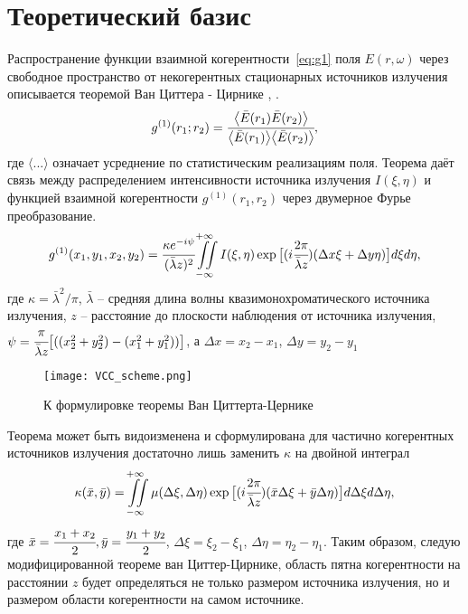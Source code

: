 \chapter{Теоретический базис} \label{chapt1}

Распространение функции взаимной когерентности~\ref{eq:g1} поля $E(r, \omega)$ через свободное пространство от некогерентных стационарных источников излучения описывается теоремой Ван Циттера - Цирнике \cite{van_cittert_wahrscheinliche_1934}, \cite{zernike_concept_1938}. 
\begin{align}
	g^{(1)} (r_1; r_2) = \cfrac{\big \langle \bar{E}(r_1) \bar{E}(r_2) \big \rangle}{\big \langle \bar{E}(r_1)\big \rangle \big \langle\bar{E}(r_2) \big \rangle}, 
	\label{eq:g1} 
\end{align}
где $\big \langle ... \big \rangle$ означает усреднение по статистическим реализациям поля. Теорема даёт связь между распределением интенсивности источника излучения $I(\xi, \eta)$ и функцией взаимной когерентности $g^{(1)} (r_1, r_2)$ через двумерное Фурье преобразование. 
\begin{align}
	g^{(1)} (x_1, y_1, x_2, y_2) = \cfrac{\kappa e^{-i\psi}}{(\bar{\lambda}z)^2} \iint \limits_{-\infty}^{+\infty} I(\xi, \eta) \exp{\big [(i \cfrac{2 \pi}{\bar{\lambda}z}) (\Delta x \xi + \Delta y \eta)\big]}d\xi d\eta, 
	\label{eq:van_cittert_zernike_theorem} 
\end{align}
где $\kappa = \bar{\lambda}^2 / \pi$, $\bar{\lambda}$ -- средняя длина волны квазимонохроматического источника излучения, $z$ -- расстояние до плоскости наблюдения от источника излучения, $\psi = \cfrac{\pi}{\bar{\lambda} z}\big[((x^2_2 + y^2_2) - (x^2_1 + y^2_1)) \big]$, а $\Delta x = x_2 - x_1$, $\Delta y = y_2 - y_1$

\begin{figure}[H] 
	\centering 	\texttt{[image: VCC\_scheme.png]}
	\caption{К формулировке теоремы Ван Циттерта-Цернике}
	\label{fig:VCC_scheme}
\end{figure}

Теорема может быть видоизменена и сформулирована для частично когерентных источников излучения достаточно лишь заменить $\kappa$ на двойной интеграл \cite{goodman_statistical_2015}
\begin{align}
	\kappa(\bar{x}, \bar{y}) = \iint \limits_{-\infty}^{+\infty} \mu(\Delta \xi, \Delta \eta) \exp{\big [(i \cfrac{2 \pi}{\bar{\lambda}z}) ( \bar{x} \Delta \xi + \bar{y} \Delta \eta)\big]}d\Delta \xi d\Delta \eta, 
\end{align}
где $\bar{x} = \cfrac{x_1 + x_2}{2}, \bar{y} = \cfrac{y_1 + y_2}{2}$,  $\Delta \xi = \xi_2 - \xi_1$, $\Delta \eta = \eta_2 - \eta_1$. Таким образом, следую модифицированной теореме ван Циттер-Цирнике, область пятна когерентности на расстоянии $z$ будет определяться не только размером источника излучения, но и размером области когерентности на самом источнике. 

